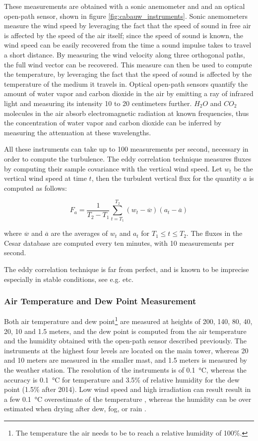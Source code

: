 \documentclass[a4paper,11pt]{kth-mag}
\begin{document}
These measurements are obtained with a sonic anemometer and and an optical open-path sensor, shown in figure \ref{fig:cabauw_instruments}. Sonic anemometers measure the wind speed by leveraging the fact that the speed of sound in free air is affected by the speed of the air itself; since the speed of sound is known, the wind speed can be easily recovered from the time a sound impulse takes to travel a short distance. By measuring the wind velocity along three orthogonal paths, the full wind vector can be recovered. This measure can then be used to compute the temperature, by leveraging the fact that the speed of sound is affected by the temperature of the medium it travels in. Optical open-path sensors quantify the amount of water vapor and carbon dioxide in the air by emitting a ray of infrared light and measuring its intensity 10 to 20 centimeters further. $H_2O$ and $CO_2$ molecules in the air absorb electromagnetic radiation at known frequencies, thus the concentration of water vapor and carbon dioxide can be inferred by measuring the attenuation at these wavelengths.

All these instruments can take up to 100 measurements per second, necessary in order to compute the turbulence. The eddy correlation technique measures fluxes by computing their sample covariance with the vertical wind speed. Let $w_t$ be the vertical wind speed at time $t$, then the turbulent vertical flux for the quantity $a$ is computed as follows:

$$
F_a=\frac{1}{T_2-T_1}\sum_{t=T_1}^{T_2}(w_t-\overline{w})(a_t-\overline{a})
$$

\noindent where $\overline{w}$ and $\overline{a}$ are the averages of $w_t$ and $a_t$ for $T_1\leq t\leq T_2$. The fluxes in the Cesar database are computed every ten minutes, with 10 measurements per second.

The eddy correlation technique is far from perfect, and is known to be imprecise especially in stable conditions, see e.g. \cite{microhandbook, ed_co2,cabauw_stable} etc.

\subsubsection{Air Temperature and Dew Point Measurement}
Both air temperature and dew point\footnote{The temperature the air needs to be to reach a relative humidity of 100\%.} are measured at heights of 200, 140, 80, 40, 20, 10 and 1.5 meters, and the dew point is computed from the air temperature and the humidity obtained with the open-path sensor described previously. The instruments at the highest four levels are located on the main tower, whereas 20 and 10 meters are measured in the smaller mast, and 1.5 meters is measured by the weather station. The resolution of the instruments is of \SI{0.1}{\celsius}, whereas the accuracy is \SI{0.1}{\celsius} for temperature and 3.5\% of relative humidity for the dew point (1.5\% after 2014). Low wind speed and high irradiation can result result in a few \SI{0.1}{\celsius} overestimate of the temperature \citep{tempoverestimate}, whereas the humidity can be over estimated when drying after dew, fog, or rain \citep{cabauwinsitu}.
\end{document}
